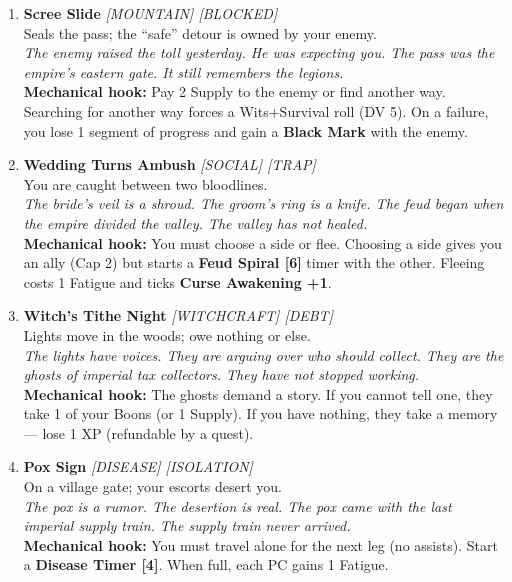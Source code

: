 \begin{enumerate}
\item \textbf{Scree Slide} \hfill {} \textit{[MOUNTAIN] [BLOCKED]} \\
  Seals the pass; the ``safe'' detour is owned by your enemy. \\
  \textit{The enemy raised the toll yesterday. He was expecting you. The pass was the empire's eastern gate. It still remembers the legions.} \\
  \textbf{Mechanical hook:} Pay 2 Supply to the enemy or find another way. Searching for another way forces a Wits+Survival roll (DV 5). On a failure, you lose 1 segment of progress and gain a \textbf{Black Mark} with the enemy.

\item \textbf{Wedding Turns Ambush} \hfill {} \textit{[SOCIAL] [TRAP]} \\
  You are caught between two bloodlines. \\
  \textit{The bride's veil is a shroud. The groom's ring is a knife. The feud began when the empire divided the valley. The valley has not healed.} \\
  \textbf{Mechanical hook:} You must choose a side or flee. Choosing a side gives you an ally (Cap 2) but starts a \textbf{Feud Spiral [6]} timer with the other. Fleeing costs 1 Fatigue and ticks \textbf{Curse Awakening +1}.

\item \textbf{Witch's Tithe Night} \hfill {} \textit{[WITCHCRAFT] [DEBT]} \\
  Lights move in the woods; owe nothing or else. \\
  \textit{The lights have voices. They are arguing over who should collect. They are the ghosts of imperial tax collectors. They have not stopped working.} \\
  \textbf{Mechanical hook:} The ghosts demand a story. If you cannot tell one, they take 1 of your Boons (or 1 Supply). If you have nothing, they take a memory --- lose 1 XP (refundable by a quest).

\item \textbf{Pox Sign} \hfill {} \textit{[DISEASE] [ISOLATION]} \\
  On a village gate; your escorts desert you. \\
  \textit{The pox is a rumor. The desertion is real. The pox came with the last imperial supply train. The supply train never arrived.} \\
  \textbf{Mechanical hook:} You must travel alone for the next leg (no assists). Start a \textbf{Disease Timer [4]}. When full, each PC gains 1 Fatigue.


\end{enumerate}
